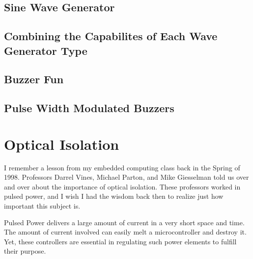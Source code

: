 \documentclass{article}
\begin{document}
\subsection{Sine Wave Generator} %
\label{sub:sine_wave_generator}



\subsection{Combining the Capabilites of Each Wave Generator Type} %
\label{sub:combining_the_capabilites_of_each_wave_generator_type}


\subsection{Buzzer Fun} %
\label{sub:buzzer_fun}


\subsection{Pulse Width Modulated Buzzers} %
\label{sub:pulse_width_modulated_buzzers}




\section{Optical Isolation} %
\label{sec:optical_isolation}

I remember a lesson from my embedded computing class back in the Spring of 1998.  Professors Darrel Vines, Michael Parton, and Mike Giesselman told us over and over about the importance of optical isolation.  These professors worked in pulsed power, and I wish I had the wisdom back then to realize just how important this subject is.  %

Pulsed Power delivers a large amount of current in a very short space and time.  The amount of current involved can easily melt a microcontroller and destroy it.  Yet, these controllers are essential in regulating such power elements to fulfill their purpose.  
\end{document}
